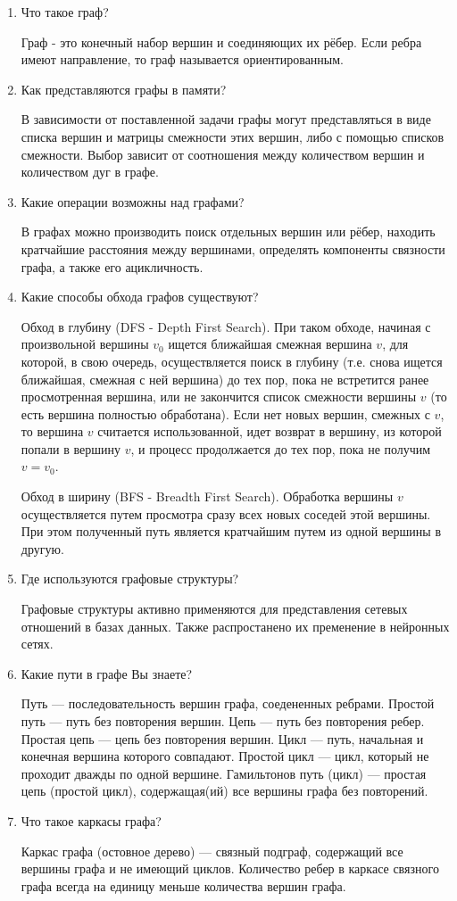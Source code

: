 \begin{enumerate}
    \item Что такое граф?
    
    Граф - это конечный набор вершин и соединяющих их рёбер. Если ребра имеют направление, то граф называется ориентированным.

    \item Как представляются графы в памяти?
    
    В зависимости от поставленной задачи графы могут представляться в виде списка вершин и матрицы смежности этих вершин, либо с помощью списков смежности. Выбор зависит от соотношения между количеством вершин и количеством дуг в графе.

    \item Какие операции возможны над графами?
    
    В графах можно производить поиск отдельных вершин или рёбер, находить кратчайшие расстояния между вершинами, определять компоненты связности графа, а также его ацикличность.

    \item Какие способы обхода графов существуют?
    
    Обход в глубину (DFS - Depth First Search). При таком обходе, начиная с произвольной вершины $v_0$ ищется ближайшая смежная вершина $v$, для которой, в свою очередь, осуществляется поиск в глубину (т.е. снова ищется ближайшая, смежная с ней вершина) до тех пор, пока не встретится ранее просмотренная вершина, или не закончится список смежности вершины $v$ (то есть вершина полностью обработана). Если нет новых вершин, смежных с $v$, то вершина $v$ считается использованной, идет возврат в вершину, из которой попали в вершину $v$, и процесс продолжается до тех пор, пока не получим $v = v_0$.

    Обход в ширину (BFS - Breadth First Search). Обработка вершины $v$ осуществляется путем просмотра сразу всех новых соседей этой вершины. При этом полученный путь является кратчайшим путем из одной вершины в другую.

    \item Где используются графовые структуры?
    
    Графовые структуры активно применяются для представления сетевых отношений в базах данных. Также распростанено их пременение в нейронных сетях.

    \item Какие пути в графе Вы знаете?
    
    Путь --- последовательность вершин графа, соедененных ребрами.
	Простой путь --- путь без повторения вершин.
	Цепь --- путь без повторения ребер.
	Простая цепь --- цепь без повторения вершин.	
	Цикл --- путь, начальная и конечная вершина которого совпадают.
	Простой цикл --- цикл, который не проходит дважды по одной вершине.
	Гамильтонов путь (цикл) --- простая цепь (простой цикл), содержащая(ий) все вершины графа без повторений.

    \item Что такое каркасы графа?
    
    Каркас графа (остовное дерево) --- связный подграф, содержащий все вершины графа и не имеющий циклов. Количество ребер в каркасе связного графа всегда на единицу меньше количества вершин графа.
\end{enumerate}



